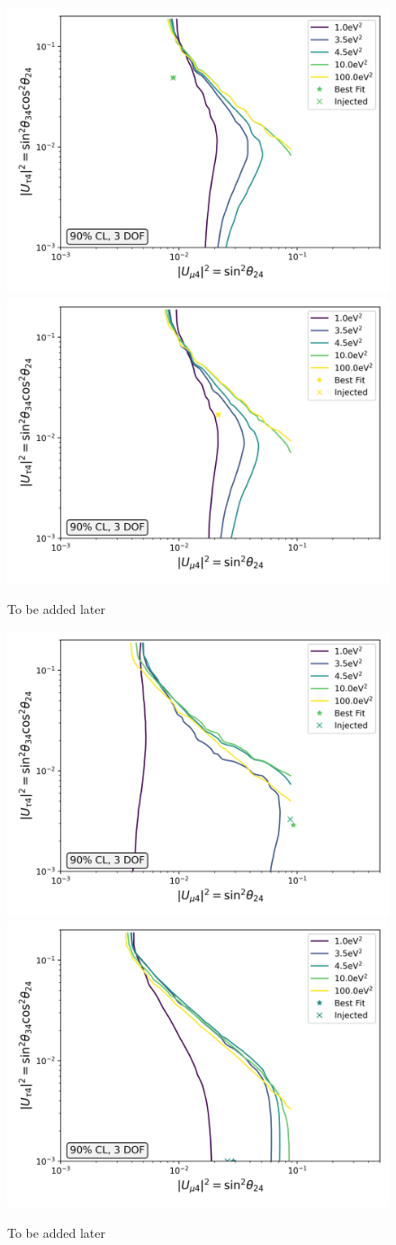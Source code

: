 \documentclass[main.tex]{subfiles}
\begin{document}
\begin{figure}
    \centering
    \includegraphics[width=0.45\linewidth]{figures/inject_recover_RealIR_5_sterile_1_cl0.9_dof3.png}%
    \includegraphics[width=0.45\linewidth]{figures/inject_recover_RealIR_6_sterile_1_cl0.9_dof3.png}
    \caption{To be added later}
\end{figure}

\begin{figure}
    \centering
    \includegraphics[width=0.45\linewidth]{figures/inject_recover_RealIR_8_sterile_7_cl0.9_dof3.png}%
    \includegraphics[width=0.45\linewidth]{figures/inject_recover_RealIR_9_sterile_4_cl0.9_dof3.png}
    \caption{To be added later}
\end{figure}
\end{document}
